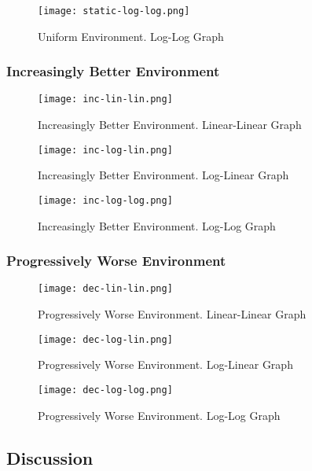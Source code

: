 \begin{figure}[ht]
    \centering
    \texttt{[image: static-log-log.png]}
    \caption{Uniform Environment. Log-Log Graph}
    \label{fig:fn}
\end{figure}


\subsubsection{Increasingly Better Environment}

\begin{figure}[ht]
    \centering
    \texttt{[image: inc-lin-lin.png]}
    \caption{Increasingly Better Environment. Linear-Linear Graph}
    \label{fig:fn}
\end{figure}

\begin{figure}[ht]
    \centering
    \texttt{[image: inc-log-lin.png]}
    \caption{Increasingly Better Environment. Log-Linear Graph}
    \label{fig:fn}
\end{figure}

\begin{figure}[ht]
    \centering
    \texttt{[image: inc-log-log.png]}
    \caption{Increasingly Better Environment. Log-Log Graph}
    \label{fig:fn}
\end{figure}

\subsubsection{Progressively Worse Environment}

\begin{figure}[ht]
    \centering
    \texttt{[image: dec-lin-lin.png]}
    \caption{Progressively Worse Environment. Linear-Linear Graph}
    \label{fig:fn}
\end{figure}

\begin{figure}[ht]
    \centering
    \texttt{[image: dec-log-lin.png]}
    \caption{Progressively Worse Environment. Log-Linear Graph}
    \label{fig:fn}
\end{figure}

\begin{figure}[ht]
    \centering
    \texttt{[image: dec-log-log.png]}
    \caption{Progressively Worse Environment. Log-Log Graph}
    \label{fig:fn}
\end{figure}


\subsection{Discussion}

